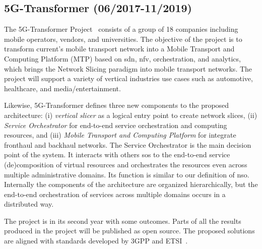 \subsection{5G-Transformer (06/2017-11/2019)}
The 5G-Transformer Project~\cite{5g-TransformerProject20175GVerticals} consists of a group of 18 companies including mobile operators, vendors, and universities. The objective of the project is to transform current’s mobile transport network into a Mobile Transport and Computing Platform (MTP) based on \gls{sdn}, \gls{nfv}, orchestration, and analytics, which brings the Network Slicing paradigm into mobile transport networks. The project will support a variety of vertical industries use cases such as automotive, healthcare, and media/entertainment. 

Likewise, 5G-Transformer defines three new components to the proposed architecture: (i) \textit{vertical slicer} as a logical entry point to create network slices, (ii) \textit{Service Orchestrator} for end-to-end service orchestration and computing resources, and (iii) \textit{Mobile Transport and Computing Platform} for integrate fronthaul and backhaul networks. The Service Orchestrator is the main decision point of the system. It interacts with others \glspl{so} to the end-to-end service (de)composition of virtual resources and orchestrates the resources even across multiple administrative domains. Its function is similar to our definition of \gls{nso}. Internally the components of the architecture are organized hierarchically, but the end-to-end orchestration of services across multiple domains occurs in a distributed way.

The project is in its second year with some outcomes. Parts of all the results produced in the project will be published as open source. The proposed solutions are aligned with standards developed by 3GPP and ETSI~\cite{H20205G-TRANSFORMERProject2018}.

